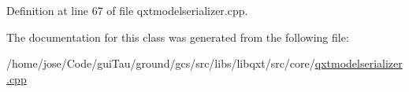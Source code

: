 Definition at line 67 of file qxtmodelserializer.\-cpp.



The documentation for this class was generated from the following file\-:\begin{DoxyCompactItemize}
\item 
/home/jose/\-Code/gui\-Tau/ground/gcs/src/libs/libqxt/src/core/\hyperlink{qxtmodelserializer_8cpp}{qxtmodelserializer.\-cpp}\end{DoxyCompactItemize}
